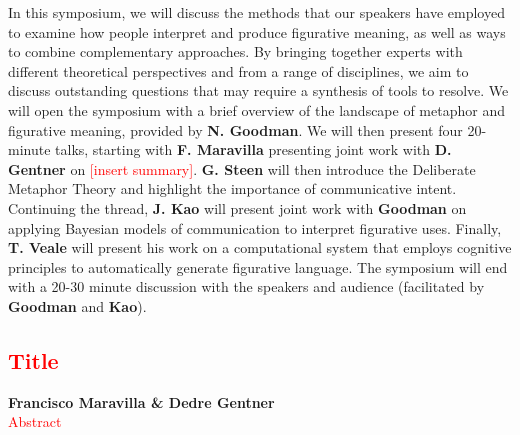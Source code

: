 \documentclass[10pt,letterpaper]{article}
\begin{document}
In this symposium, we will discuss the methods that our speakers have employed to examine how people interpret and produce figurative meaning, as well as ways to combine complementary approaches. By bringing together experts with different theoretical perspectives and from a range of disciplines, we aim to discuss outstanding questions that may require a synthesis of tools to resolve. We will open the symposium with a brief overview of the landscape of metaphor and figurative meaning, provided by \textbf{N. Goodman}. We will then present four 20-minute talks, starting with \textbf{F. Maravilla} presenting joint work with \textbf{D. Gentner} on \textcolor{red}{[insert summary]}.
\textbf{G. Steen} will then introduce the Deliberate Metaphor Theory and highlight the importance of communicative intent. Continuing the thread, \textbf{J. Kao} will present joint work with \textbf{Goodman} on applying Bayesian models of communication to interpret figurative uses. Finally, \textbf{T. Veale} will present his work on a computational system that employs cognitive principles to automatically generate figurative language.
The symposium will end with a 20-30 minute discussion with the speakers and audience (facilitated by \textbf{Goodman} and \textbf{Kao}).	


\textcolor{red}{\section{Title}}
\large \textbf{Francisco Maravilla \& Dedre Gentner}\\
\textcolor{red}{Abstract}
\end{document}
